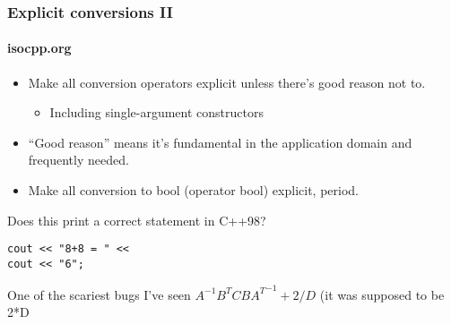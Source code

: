 \begin{frame}[fragile]
\frametitle{Explicit conversions II}
\framesubtitle{isocpp.org}


\begin{itemize}
\item Make all conversion operators explicit unless there's good
  reason not to.

  \begin{itemize}
    \item Including single-argument constructors
  \end{itemize}
\item ``Good reason'' means it's fundamental in the application domain
  and frequently needed.
\item Make all conversion to bool (operator bool) explicit, period.
\end{itemize}
\pause{}
Does this print a correct statement in C++98?
\begin{verbatim}
cout << "8+8 = " <<
cout << "6";
\end{verbatim}
\pause{}
One of the scariest bugs I've seen
\vskip 6pt
$A^{-1}B^{T}CB{A^{T}}^{-1} + 2/D$
(it was supposed to be 2*D
\pause{}


\end{frame}
